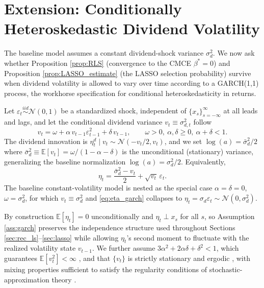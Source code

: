 \section{Extension: Conditionally Heteroskedastic Dividend Volatility}\label{sec:garch_extension}

The baseline model assumes a constant dividend-shock variance $\sigma_d^2$. We now ask whether
Proposition \ref{prop:RLS} (convergence to the CMCE $\beta^*=0$) and Proposition
\ref{prop:LASSO_estimate} (the LASSO selection probability) survive when dividend volatility is
allowed to vary over time according to a GARCH(1,1) process, the workhorse specification for
conditional heteroskedasticity in returns.

\begin{assumption}\label{ass:garch}
Let $\varepsilon_t \stackrel{iid}{\sim} \mathcal N(0,1)$ be a standardized shock, independent of
$\{x_s\}_{s=-\infty}^{\infty}$ at all leads and lags, and let the conditional dividend variance
$v_t \equiv \sigma_{d,t}^2$ follow
\begin{equation}\label{eq:garch11}
v_t = \omega + \alpha\, v_{t-1}\varepsilon_{t-1}^2 + \delta\, v_{t-1}, \qquad
\omega>0,\ \alpha,\delta\ge 0,\ \alpha+\delta<1.
\end{equation}
The dividend innovation is $\eta^d_t \mid v_t \sim \mathcal N(-v_t/2, v_t)$, and we set
$\log(a) = \bar\sigma_d^2/2$ where $\bar\sigma_d^2 \equiv \mathbb E[v_t] = \omega/(1-\alpha-\delta)$
is the unconditional (stationary) variance, generalizing the baseline normalization
$\log(a)=\sigma_d^2/2$. Equivalently,
\begin{equation}\label{eq:eta_garch}
\eta_t = \frac{\bar\sigma_d^2 - v_t}{2} + \sqrt{v_t}\,\varepsilon_t .
\end{equation}
The baseline constant-volatility model is nested as the special case $\alpha=\delta=0$, $\omega=\sigma_d^2$,
for which $v_t\equiv \sigma_d^2$ and \eqref{eq:eta_garch} collapses to $\eta_t=\sigma_d \varepsilon_t \sim \mathcal N(0,\sigma_d^2)$.
\end{assumption}

By construction $\mathbb E[\eta_t]=0$ unconditionally and $\eta_t \perp x_s$ for all $s$, so Assumption
\ref{ass:garch} preserves the independence structure used throughout Sections \ref{sec:rec_ls}--\ref{sec:lasso}
while allowing $\eta_t$'s second moment to fluctuate with the realized volatility state $v_{t-1}$.
We further assume $3\alpha^2+2\alpha\delta+\delta^2<1$, which guarantees $\mathbb E[v_t^2]<\infty$
\citep{Bollerslev1986}, and that $\{v_t\}$ is strictly stationary and ergodic
\citep{BougerolPicard1992,Nelson1990}, with mixing properties sufficient to satisfy the regularity
conditions of stochastic-approximation theory \citep{CarrascoChen2002}.

